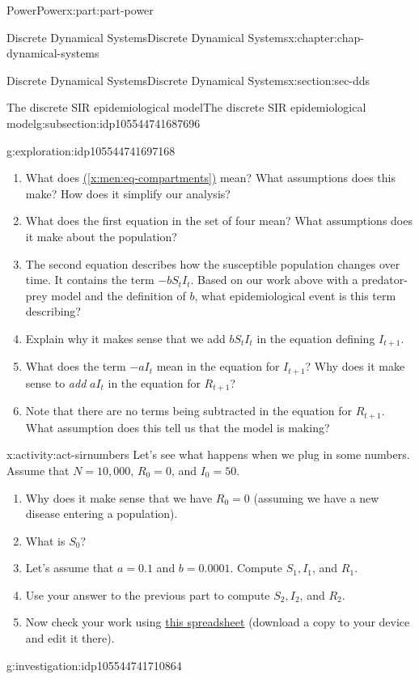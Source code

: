 \documentclass[oneside,10pt,]{book}
\newcommand{\xreffont}{\relax}
\numberwithin{equation}{section}
\begin{document}
\begin{partptx}{Power}{}{Power}{}{}{x:part:part-power}
\begin{chapterptx}{Discrete Dynamical Systems}{}{Discrete Dynamical Systems}{}{}{x:chapter:chap-dynamical-systems}
\begin{sectionptx}{Discrete Dynamical Systems}{}{Discrete Dynamical Systems}{}{}{x:section:sec-dds}
\begin{subsectionptx}{The discrete SIR epidemiological model}{}{The discrete SIR epidemiological model}{}{}{g:subsection:idp105544741687696}
\begin{exploration}{}{g:exploration:idp105544741697168}
\begin{enumerate}
\item{}What does \hyperref[x:men:eq-compartments]{({\xreffont\ref{x:men:eq-compartments}})} mean? What assumptions does this make? How does it simplify our analysis?%
\item{}What does the first equation in the set of four mean? What assumptions does it make about the population?%
\item{}The second equation describes how the susceptible population changes over time. It contains the term \(-b S_t I_t\). Based on our work above with a predator-prey model and the definition of \(b\), what epidemiological event is this term describing?%
\item{}Explain why it makes sense that we add \(b S_t I_t\) in the equation defining \(I_{t+1}\).%
\item{}What does the term \(-a I_t\) mean in the equation for \(I_{t+1}\)? Why does it make sense to \emph{add} \(a I_t\) in the equation for \(R_{t+1}\)?%
\item{}Note that there are no terms being subtracted in the equation for \(R_{t+1}\). What assumption does this tell us that the model is making?%
\end{enumerate}
\end{exploration}%
\begin{activity}{}{x:activity:act-sirnumbers}%
Let's see what happens when we plug in some numbers. Assume that \(N = 10,000\), \(R_0 = 0\), and \(I_0 = 50\).%
%
\begin{enumerate}
\item{}Why does it make sense that we have \(R_0 = 0\) (assuming we have a new disease entering a population).%
\item{}What is \(S_0\)?%
\item{}Let's assume that \(a = 0.1\) and \(b = 0.0001\). Compute \(S_1, I_1\), and \(R_1\).%
\item{}Use your answer to the previous part to compute \(S_2, I_2\), and \(R_2\).%
\item{}Now check your work using \href{https://docs.google.com/spreadsheets/d/153LO2O21_TwEYyODq2Km90oRrilLEpfYmgb8w3AJSQo/edit?usp=sharing}{this spreadsheet}\footnotemark{} (download a copy to your device and edit it there).%
\end{enumerate}
\end{activity}%
%
\begin{investigation}{}{g:investigation:idp105544741710864}%

\end{investigation}
\end{subsectionptx}
\end{sectionptx}
\end{chapterptx}
\end{partptx}
\end{document}
